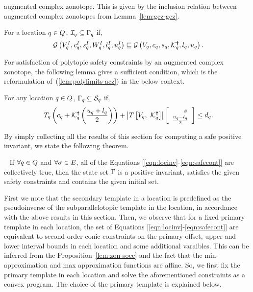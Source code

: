 augmented complex zonotope.  This is given by the inclusion relation
between augmented complex zonotopes from Lemma~\ref{lem:gcz-gcz}.
\begin{lemma}
 For a location $q \in Q$, $\mathcal{I}_q\subseteq
  \Gamma_q$ if,
\begin{align}~\label{eqn:initcont}
\mathcal{G}\left(V^I_q,c^I_q,s^I_q,W^I_q,l^I_q,u^I_q\right)\sqsubseteq\mathcal{G}\left(V_q,c_q,s_q,\mathcal{K}^{\bm{\dagger}}_q,l_q,u_q\right).
\end{align}
\end{lemma}
%
For satisfaction of polytopic safety constraints by an augmented
complex zonotope, the following lemma gives a sufficient condition,
which is the reformulation of~(\ref{lem:polylimits-acz}) in
the below context.
%
\begin{lemma}
For any location $q\in Q$,
  $\Gamma_q\subseteq \mathcal{S}_q$ if,
\begin{align}~\label{eqn:safecont}
T_q\left(c_q+\mathcal{K}^{\bm{\dagger}}_q\left(\frac{u_q+l_q}{2}\right)\right)+\left|T\left[V_q,~\mathcal{K}^{\bm{\dagger}}_q\right]\right|\left[\begin{array}{c}{\hspace{1.5em}s}\\{\frac{u_q-l_q}{2}} \end{array}\right]\leq d_q.
\end{align}
\end{lemma}
%
By simply collecting all the results of this section for computing a safe
positive invariant, we state the following theorem.
%
\begin{theorem}~\label{thm:main} If
  $\forall q\in Q$ and $\forall \sigma\in E$, all of
  the Equations [\ref{eqn:locinv}-\ref{eqn:safecont}] are collectively
  true, then the state set $\Gamma$ is a positive invariant,
  satisfies the given safety constraints and contains the given
  initial set.
\end{theorem}

  First we note that the secondary
template in a location is predefined as the pseudoinverse of the
subparallelotopic template in the location, in accordance with the
above results in this section.  Then, we observe that for a fixed
primary template in each location, the set of
Equations [\ref{eqn:locinv}-\ref{eqn:safecont}] are equivalent to
second order conic constraints on the primary offset, upper and lower
interval bounds in each location and some additional varaibles.  This
can be inferred from the Proposition~\ref{lem:zon-socc} and the fact
that the min-approximation and max approximation functions are affine. So, we first fix the primary template in each
location and solve the aforementioned constraints as a convex program.
The choice of the primary template is explained below.

